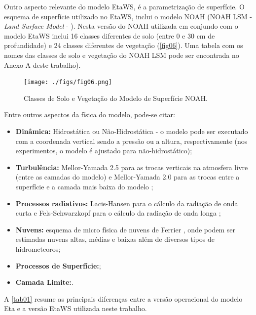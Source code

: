 Outro aspecto relevante do modelo EtaWS, é a parametrização de superfície. O esquema de superfície utilizado no EtaWS, inclui o modelo NOAH (NOAH LSM - \textit{Land Surface Model} - \cite{mitchell01}). Nesta versão do NOAH utilizada em conjundo com o modelo EtaWS inclui 16 classes diferentes de solo (entre 0 e 30 cm de profundidade) e 24 classes diferentes de vegetação (\autoref{fig06}). Uma tabela com os nomes das classes de solo e vegetação do NOAH LSM pode ser encontrada no Anexo A deste trabalho).

\begin{figure}
\centering
\texttt{[image: ./figs/fig06.png]}
\caption{Classes de Solo e Vegetação do Modelo de Superfície NOAH.}
\label{fig06}
\end{figure}

Entre outros aspectos da física do modelo, pode-se citar:

\begin{itemize}
\item \textbf{Dinâmica:} Hidrostática ou Não-Hidrostática - o modelo pode ser executado com a coordenada vertical sendo a pressão ou a altura, respectivamente (nos experimentos, o modelo é ajustado para não-hidrostático);
\item \textbf{Turbulência:} Mellor-Yamada 2.5 para as trocas verticais na atmosfera livre (entre as camadas do modelo) e Mellor-Yamada 2.0 para as trocas entre a superfície e a camada mais baixa do modelo \cite{melloryamada74};
\item \textbf{Processos radiativos:} Lacis-Hansen para o cálculo da radiação de onda curta \cite{lacishansen74} e Fels-Schwarzkopf para o cálculo da radiação de onda longa \cite{felsschwarzkopf75};
\item \textbf{Nuvens:} esquema de micro física de nuvens de Ferrier \cite{ferrieretal02}, onde podem ser estimadas nuvens altas, médias e baixas além de diversos tipos de hidrometeoros;
\item \textbf{Processos de Superfície:};
\item \textbf{Camada Limite:}.
\end{itemize}

A \autoref{tab01} resume as principais diferenças entre a versão operacional do modelo Eta e a versão EtaWS utilizada neste trabalho.

